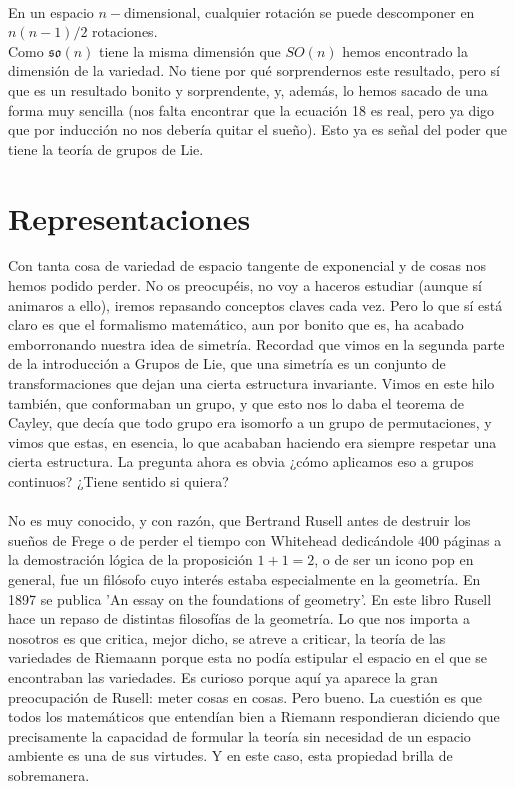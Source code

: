 \documentclass[12pt]{article}
\begin{document}
\\
En un espacio $n-$dimensional, cualquier rotación se puede descomponer en $n(n-1)/2$ rotaciones.\\
Como $\mathfrak{s}\mathfrak{o}(n)$ tiene la misma dimensión que $SO(n)$ hemos encontrado la dimensión de la variedad. 
No tiene por qué sorprendernos este resultado, pero sí que es un resultado bonito y sorprendente, y, además, lo hemos sacado de una forma muy sencilla (nos falta encontrar que la ecuación 18 es real, pero ya digo que por inducción no nos debería quitar el sueño). Esto ya es señal del poder que tiene la teoría de grupos de Lie.\\ 

\section{Representaciones}
Con tanta cosa de variedad de espacio tangente de exponencial y de cosas nos hemos podido perder. No os preocupéis, no voy a haceros estudiar (aunque sí animaros a ello), iremos repasando conceptos claves cada vez. Pero lo que sí está claro es que el formalismo matemático, aun por bonito que es, ha acabado emborronando nuestra idea de simetría. Recordad que vimos en la segunda parte de la introducción a Grupos de Lie, que una simetría es un conjunto de transformaciones que dejan una cierta estructura invariante. Vimos en este hilo también, que conformaban un grupo, y que esto nos lo daba el teorema de Cayley, que decía que todo grupo era isomorfo a un grupo de permutaciones, y vimos que estas, en esencia, lo que acababan haciendo era siempre respetar una cierta estructura. La pregunta ahora es obvia ¿cómo aplicamos eso a grupos continuos? ¿Tiene sentido si quiera? \\\\
No es muy conocido, y con razón, que Bertrand Rusell antes de destruir los sueños de Frege o de perder el tiempo con Whitehead dedicándole 400 páginas a la demostración lógica de la proposición $1+1=2$, o de ser un icono pop en general,  fue un filósofo cuyo interés estaba especialmente en la geometría. En 1897 se publica 'An essay on the foundations of geometry'. En este libro Rusell hace un repaso de distintas filosofías de la geometría. Lo que nos importa a nosotros es que critica, mejor dicho, se atreve a criticar, la teoría de las variedades de Riemaann porque esta no podía estipular el espacio en el que se encontraban las variedades. Es curioso porque aquí ya aparece la gran preocupación de Rusell: meter cosas en cosas. Pero bueno. La cuestión es que todos los matemáticos que entendían bien a Riemann respondieran diciendo que precisamente la capacidad de formular la teoría sin necesidad de un espacio ambiente es una de sus virtudes. Y en este caso, esta propiedad brilla de sobremanera. \\
\end{document}
